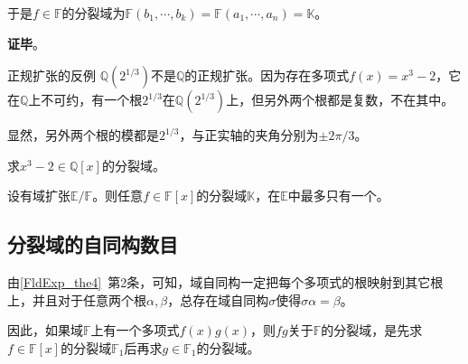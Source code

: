 于是$f\in\mathbb{F}$的分裂域为$\mathbb{F}(b_1, \cdots, b_k)=\mathbb{F}(a_1, \cdots, a_n)=\mathbb{K}$。

\textbf{证毕}。








\begin{example}{正规扩张的反例}
$\mathbb{Q}(2^{1/3})$不是$\mathbb{Q}$的正规扩张。因为存在多项式$f(x)=x^3-2$，它在$\mathbb{Q}$上不可约，有一个根$2^{1/3}$在$\mathbb{Q}(2^{1/3})$上，但另外两个根都是复数，不在其中。

显然，另外两个根的模都是$2^{1/3}$，与正实轴的夹角分别为$\pm 2\pi/3$。
\end{example}

\begin{exercise}{}
求$x^3-2\in\mathbb{Q}[x]$的分裂域。
\end{exercise}



\begin{corollary}{}
设有域扩张$\mathbb{E}/\mathbb{F}$。则任意$f\in\mathbb{F}[x]$的分裂域$\mathbb{K}$，在$\mathbb{E}$中最多只有一个。
\end{corollary}









\subsection{分裂域的自同构数目}

由\autoref{FldExp_the4}~第2条，可知，域自同构一定把每个多项式的根映射到其它根上，并且对于任意两个根$\alpha, \beta$，总存在域自同构$\sigma$使得$\sigma \alpha=\beta$。

因此，如果域$\mathbb{F}$上有一个多项式$f(x)g(x)$，则$fg$关于$\mathbb{F}$的分裂域，是先求$f\in\mathbb{F}[x]$的分裂域$\mathbb{F}_1$后再求$g\in\mathbb{F}_1$的分裂域。


